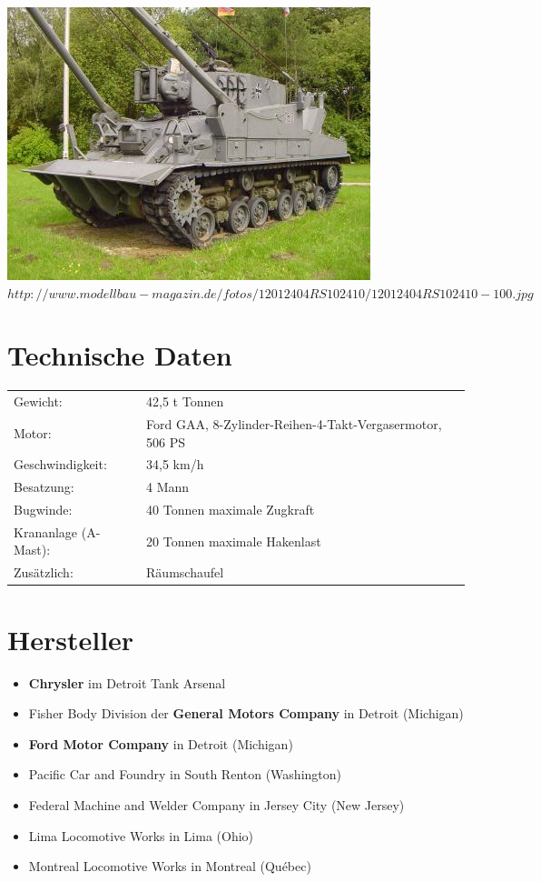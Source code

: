 \documentclass[12pt,a4paper]{report}
\begin{document}
\includegraphics[trim = -9cm 0 0 -5cm,scale=0.4]{M74}
\\
$http://www.modellbau-magazin.de/fotos/12012404RS102410/12012404RS102410-100.jpg$

\chapter{Technische Daten}

\begin{tabular}{l|l}
	Gewicht:& 42,5 t Tonnen\\
	Motor:& Ford GAA, 8-Zylinder-Reihen-4-Takt-Vergasermotor, 506 PS\\
	Geschwindigkeit:& 34,5 km/h\\
	Besatzung:& 4 Mann\\
	Bugwinde:& 40 Tonnen maximale Zugkraft\\
	Krananlage (A-Mast):& 20 Tonnen maximale Hakenlast\\
	Zusätzlich:& Räumschaufel\\
\end{tabular}



\chapter{Hersteller}
\begin{itemize}
   \item {\bf Chrysler} im Detroit Tank Arsenal
   \item Fisher Body Division der {\bf General Motors Company} in Detroit (Michigan)
   \item {\bf Ford Motor Company} in Detroit (Michigan)
   \item Pacific Car and Foundry in South Renton (Washington)
   \item Federal Machine and Welder Company in Jersey City (New Jersey)
   \item Lima Locomotive Works in Lima (Ohio)
   \item Montreal Locomotive Works in Montreal (Québec)
\end{itemize}
\end{document}
